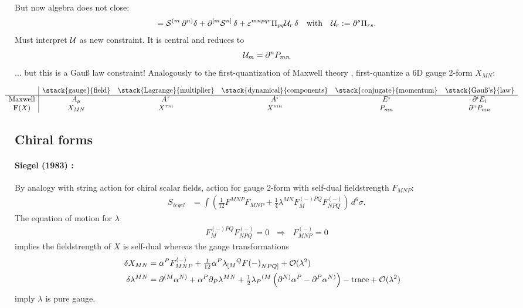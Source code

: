 \documentclass[12pt]{article} %
\numberwithin{equation}{section}
\def\S{{\cal S}}
\def\U{{\cal U}}
\begin{document}
But now algebra does not close:
\begin{align*}
[\S^m , \S^n] =   \S^{(m} \, \partial^{n)}\delta + \partial^{[m}\S^{n]} \,\delta + \varepsilon^{mnpqr} \Pi_{pq} \U_r \, \delta
~~~\mathrm{with}~~~
\U_r := \partial^s \Pi_{rs}.
\end{align*}
Must interpret $\U$ as new constraint. It is central and reduces to 
\begin{align*}
\U_m = \partial^n P_{mn} 
\end{align*} 
... but this is a Gau\ss{} law constraint! 
Analogously to the first-quantization of Maxwell theory \cite{dirac2001lectures}, first-quantize a 6D gauge 2-form $X_{MN}$:
{\renewcommand{\arraystretch}{1.3} %
\begin{align*}
\hspace{-5mm}
\begin{array}{c|ccccccc}
	&\stack{\textrm{gauge}}{\textrm{field}} 
	&\stack{ \textrm{Lagrange} }{ \textrm{multiplier} } 	
	&\stack{\textrm{dynamical}}{\textrm{components}}
	&\stack{ \textrm{conjugate} }{ \textrm{momentum} }
	&\stack{\textrm{Gau\ss{}'s}}{\textrm{law}}
\\ \hline
\textrm{Maxwell} & A_\mu & A^\tau & A^i & E^i & \partial^i E_i
\\
\mathbf F(X) &X_{MN} & X^{\tau m} & X^{mn} & P_{mn} & \partial^nP_{mn} 
\end{array}
\end{align*}

\subsection{Chiral forms}
\paragraph{
	Siegel (1983) \cite{Siegel:1983es}: 
}
By analogy with string action for chiral scalar fields, 
action for gauge 2-form with self-dual fieldstrength $F_{MNP}$:
\begin{align*}
S_{iegel} &= \int 
	\left(
	\tfrac 1{12} F^{MNP} F_{MNP} + \tfrac14 \lambda^{MN} F_M^{(-)PQ}F^{(-)}_{NPQ}
	\right)\,d^6\sigma  .	
\end{align*}
The equation of motion for $\lambda$
\begin{align*}
F_M^{(-)PQ}F^{(-)}_{NPQ} = 0
~~~\Rightarrow~~~
F^{(-)}_{MNP} = 0	
\end{align*}
implies the fieldstrength of $X$ is self-dual whereas the gauge transformations
\begin{align*}
\delta X_{MN} &= \alpha^P F^{(-)}_{MNP} + \tfrac1{12} \alpha^P \lambda_{[M}{}^QF{(-)}_{NPQ]} 
	+\mathcal O (\lambda^2) 
\cr
\delta \lambda^{MN} &= \partial^{(M} \alpha^{N)}
	+ \alpha^P\partial_P \lambda^{MN}
	+ \tfrac12 \lambda_P{}^{(M} \left(
		\partial^{N)} \alpha^P - \partial^P \alpha^{N)} 
		\right)
-\textrm{trace}		
+\mathcal O (\lambda^2) 
\nonumber	
\end{align*}
imply $\lambda$ is pure gauge.

}
\end{document}

